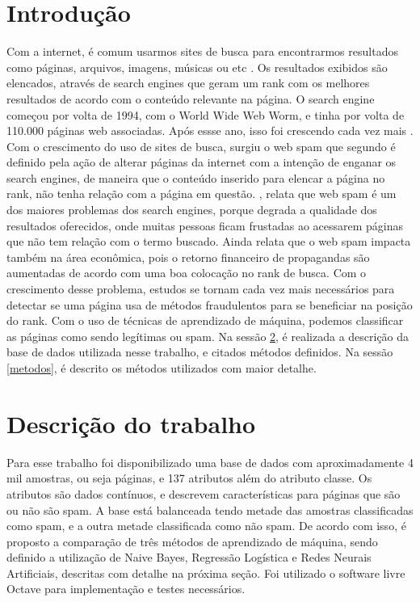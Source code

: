 \documentclass[10pt, conference, compsocconf]{IEEEtran}
\begin{document}
\section{Introdução} 
Com a internet, é comum usarmos sites de busca para encontrarmos resultados como páginas, arquivos, imagens, músicas ou etc . Os resultados exibidos são elencados, através de search engines que geram um rank com os melhores resultados de acordo com o conteúdo relevante na página. O search engine começou por volta de 1994, com o World Wide Web Worm, e tinha por volta de 110.000 páginas web associadas. Após essse ano, isso foi crescendo cada vez mais \cite{1}.
Com o crescimento do uso de sites de busca, surgiu o web spam que segundo \cite{2} é definido pela ação de alterar páginas da internet com a intenção de enganar os search engines, de maneira que o conteúdo inserido para elencar a página no rank, não tenha relação com a página em questão.
\cite{3}, relata que web spam é um dos maiores problemas dos search engines, porque degrada a qualidade dos resultados oferecidos, onde muitas pessoas ficam frustadas ao acessarem páginas que não tem relação com o termo buscado. Ainda relata que o web spam impacta também na área econômica, pois o retorno financeiro de propagandas são aumentadas de acordo com uma boa colocação no rank de busca.
Com o crescimento desse problema, estudos se tornam cada vez mais necessários para detectar se uma página usa de métodos fraudulentos para se beneficiar na posição do rank. Com o uso de técnicas de aprendizado de máquina, podemos classificar as páginas como sendo legítimas ou spam.
Na sessão \ref{descricao}, é realizada a descrição da base de dados utilizada nesse trabalho, e citados métodos definidos. Na sessão \ref{metodos}, é descrito os métodos utilizados com maior detalhe.

\section{Descrição do trabalho}\label{descricao} 
Para esse trabalho foi disponibilizado uma base de dados com aproximadamente 4 mil amostras, ou seja páginas, e 137 atributos além do atributo classe. Os atributos são dados contínuos, e  descrevem características para páginas que são ou não são spam. A base está balanceada tendo metade das amostras classificadas como spam, e a outra metade classificada como não spam.
De acordo com isso, é proposto a comparação de três métodos de aprendizado de máquina, sendo definido a utilização de Naive Bayes, Regressão Logística e Redes Neurais Artificiais, descritas com detalhe na próxima seção.
Foi utilizado o software livre Octave para implementação e testes necessários.
\end{document}
